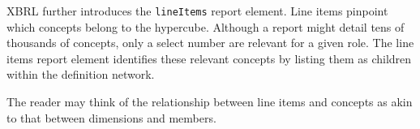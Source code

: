 XBRL further introduces the \texttt{lineItems} report element.
Line items pinpoint which concepts belong to the hypercube.
Although a report might detail tens of thousands of concepts, only a select number are relevant for a given role.
The line items report element identifies these relevant concepts by listing them as children within the definition network.

The reader may think of the relationship between line items and concepts as akin to that between dimensions and members.




